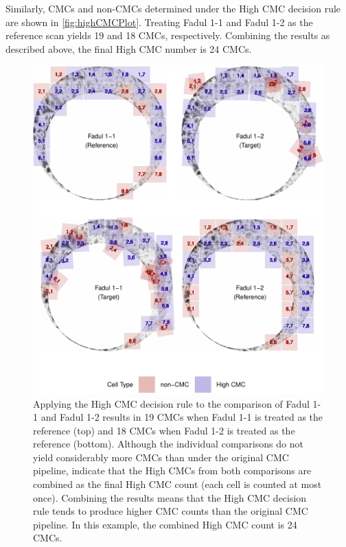 Similarly, CMCs and non-CMCs determined under the High CMC decision rule
are shown in \autoref{fig:highCMCPlot}. Treating Fadul 1-1 and Fadul 1-2
as the reference scan yields 19 and 18 CMCs, respectively. Combining the
results as described above, the final High CMC number is 24 CMCs.

\begin{Schunk}
\begin{figure}[htbp]

{\centering \includegraphics[width=\textwidth]{figures/kmHighCMC} 

}

\caption{\label{fig:highCMCPlot} Applying the High CMC decision rule to the comparison of Fadul 1-1 and Fadul 1-2 results in 19 CMCs when Fadul 1-1 is treated as the reference (top) and 18 CMCs when Fadul 1-2 is treated as the reference (bottom). Although the individual comparisons do not yield considerably more CMCs than under the original CMC pipeline, \citet{tong_improved_2015} indicate that the High CMCs from both comparisons are combined as the final High CMC count (each cell is counted at most once). Combining the results means that the High CMC decision rule tends to produce higher CMC counts than the original CMC pipeline. In this example, the combined High CMC count is 24 CMCs.}\label{fig:unnamed-chunk-17}
\end{figure}
\end{Schunk}

